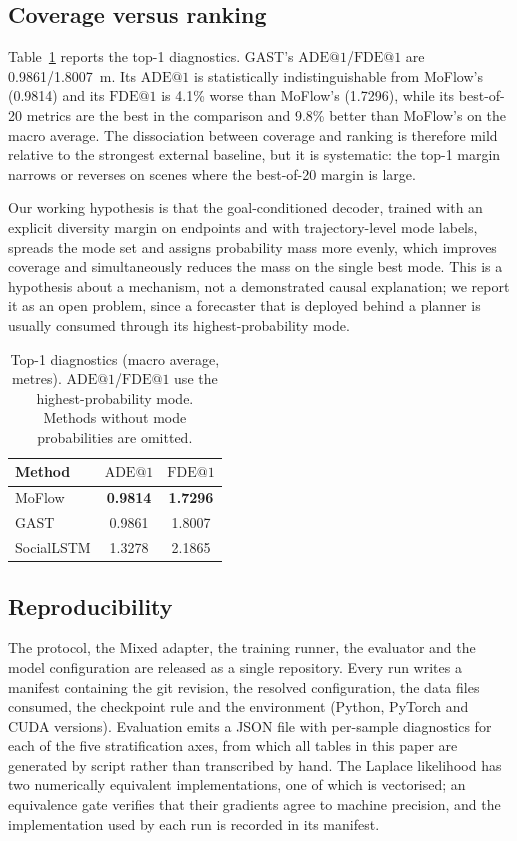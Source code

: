 \subsection{Coverage versus ranking}
\label{sec:coverage}

Table~\ref{tab:top1} reports the top-1 diagnostics. GAST's $\mathrm{ADE@1}$/$\mathrm{FDE@1}$ are 0.9861/1.8007~m. Its $\mathrm{ADE@1}$ is statistically indistinguishable from MoFlow's (0.9814) and its $\mathrm{FDE@1}$ is 4.1\% worse than MoFlow's (1.7296), while its best-of-20 metrics are the best in the comparison and 9.8\% better than MoFlow's on the macro average. The dissociation between coverage and ranking is therefore mild relative to the strongest external baseline, but it is systematic: the top-1 margin narrows or reverses on scenes where the best-of-20 margin is large.

Our working hypothesis is that the goal-conditioned decoder, trained with an explicit diversity margin on endpoints and with trajectory-level mode labels, spreads the mode set and assigns probability mass more evenly, which improves coverage and simultaneously reduces the mass on the single best mode. This is a hypothesis about a mechanism, not a demonstrated causal explanation; we report it as an open problem, since a forecaster that is deployed behind a planner is usually consumed through its highest-probability mode.

\begin{table}[t]
\centering
\footnotesize
\setlength{\tabcolsep}{4.2pt}
\caption{Top-1 diagnostics (macro average, metres). $\mathrm{ADE@1}$/$\mathrm{FDE@1}$ use the highest-probability mode. Methods without mode probabilities are omitted.}
\label{tab:top1}
\begin{tabular}{@{}lcc@{}}
\toprule
Method & $\mathrm{ADE@1}$ & $\mathrm{FDE@1}$ \\
\midrule
MoFlow & \textbf{0.9814} & \textbf{1.7296} \\
GAST & 0.9861 & 1.8007 \\
SocialLSTM & 1.3278 & 2.1865 \\
\bottomrule
\end{tabular}
\end{table}

\subsection{Reproducibility}
\label{sec:repro}

The protocol, the Mixed adapter, the training runner, the evaluator and the model configuration are released as a single repository. Every run writes a manifest containing the git revision, the resolved configuration, the data files consumed, the checkpoint rule and the environment (Python, PyTorch and CUDA versions). Evaluation emits a JSON file with per-sample diagnostics for each of the five stratification axes, from which all tables in this paper are generated by script rather than transcribed by hand. The Laplace likelihood has two numerically equivalent implementations, one of which is vectorised; an equivalence gate verifies that their gradients agree to machine precision, and the implementation used by each run is recorded in its manifest.
